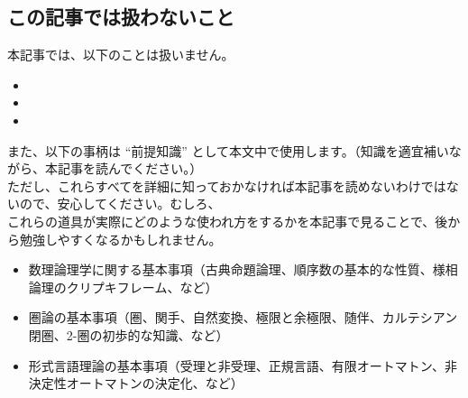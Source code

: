 \documentclass[
		head_space=20mm,
		foot_space=20mm,
		gutter=10mm,
		line_length=190mm
]{jlreq}
\begin{document}
\subsection*{この記事では扱わないこと}

\noindent 本記事では、以下のことは扱いません。

\begin{itemize}
	\item 
	\item 
	\item 
\end{itemize}

\noindent また、以下の事柄は ``前提知識'' として本文中で使用します。（知識を適宜補いながら、本記事を読んでください。）\\ ただし、これらすべてを詳細に知っておかなければ本記事を読めないわけではないので、安心してください。むしろ、\\これらの道具が実際にどのような使われ方をするかを本記事で見ることで、後から勉強しやすくなるかもしれません。

\begin{itemize}
	\item {数理論理学}に関する基本事項（古典命題論理、順序数の基本的な性質、様相論理のクリプキフレーム、など）
	\item {圏論}の基本事項（圏、関手、自然変換、極限と余極限、随伴、カルテシアン閉圏、2-圏の初歩的な知識、など）
	\item {形式言語理論}の基本事項（受理と非受理、正規言語、有限オートマトン、非決定性オートマトンの決定化、など）
\end{itemize}


\clearpage

\end{document}
